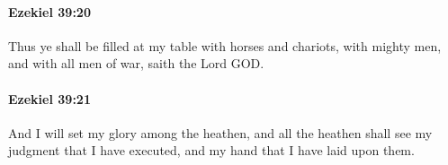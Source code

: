 		\paragraph{Ezekiel 39:20} %
			\label{EZEKIEL-39-20}

			Thus ye shall be filled at my table with horses and chariots, with mighty men, and with all men of war, saith the Lord GOD.


		\paragraph{Ezekiel 39:21} %
			\label{EZEKIEL-39-21}

			And I will set my glory among the heathen, and all the heathen shall see my judgment that I have executed, and my hand that I have laid upon them.


